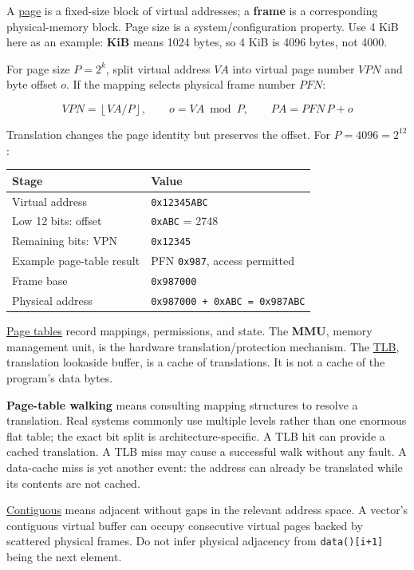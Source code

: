 A \hyperref[appendix-0c67cd5bf30a]{page} is a fixed-size block of virtual addresses; a \textbf{frame} is a corresponding physical-memory block. Page size is a system/configuration property. Use 4 KiB here as an example: \textbf{KiB} means 1024 bytes, so 4 KiB is 4096 bytes, not 4000.

For page size \(P=2^k\), split virtual address \(VA\) into virtual page number \(VPN\) and byte offset \(o\). If the mapping selects physical frame number \(PFN\):

\[
VPN=\left\lfloor VA/P\right\rfloor,\qquad
o=VA\bmod P,\qquad
PA=PFN\,P+o
\]

Translation changes the page identity but preserves the offset. For \(P=4096=2^{12}\):

{\def\LTcaptype{none} %
\begin{longtable}[]{@{}ll@{}}
\toprule\noalign{}
Stage & Value \\
\midrule\noalign{}
\endhead
\bottomrule\noalign{}
\endlastfoot
Virtual address & \texttt{0x12345ABC} \\
Low 12 bits: offset & \texttt{0xABC} = 2748 \\
Remaining bits: VPN & \texttt{0x12345} \\
Example page-table result & PFN \texttt{0x987}, access permitted \\
Frame base & \texttt{0x987000} \\
Physical address & \texttt{0x987000\ +\ 0xABC\ =\ 0x987ABC} \\
\end{longtable}
}

\hyperref[appendix-01e5905165c4]{Page tables} record mappings, permissions, and state. The \textbf{MMU}, memory management unit, is the hardware translation/protection mechanism. The \hyperref[appendix-7a2d9c5ce511]{TLB}, translation lookaside buffer, is a cache of translations. It is not a cache of the program's data bytes.

\textbf{Page-table walking} means consulting mapping structures to resolve a translation. Real systems commonly use multiple levels rather than one enormous flat table; the exact bit split is architecture-specific. A TLB hit can provide a cached translation. A TLB miss may cause a successful walk without any fault. A data-cache miss is yet another event: the address can already be translated while its contents are not cached.

\hyperref[appendix-f897c1ddac8f]{Contiguous} means adjacent without gaps in the relevant address space. A vector's contiguous virtual buffer can occupy consecutive virtual pages backed by scattered physical frames. Do not infer physical adjacency from \texttt{data(){[}i+1{]}} being the next element.

